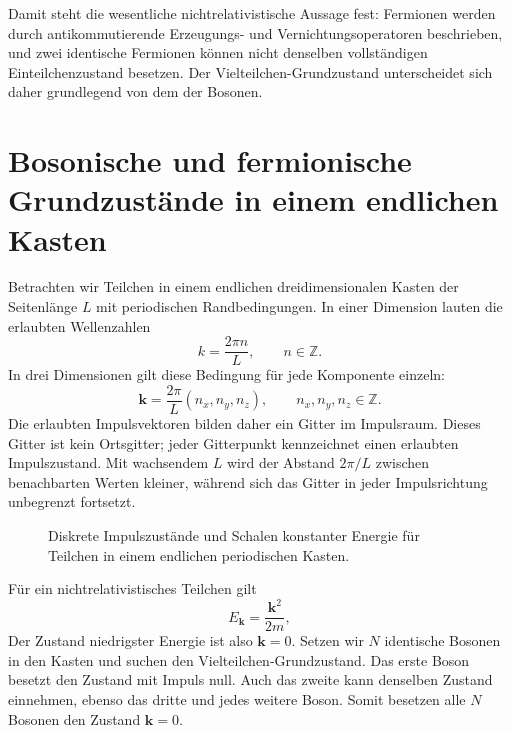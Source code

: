 Damit steht die wesentliche nichtrelativistische Aussage fest: Fermionen werden durch antikommutierende Erzeugungs- und Vernichtungsoperatoren beschrieben, und zwei identische Fermionen können nicht denselben vollständigen Einteilchenzustand besetzen. Der Vielteilchen-Grundzustand unterscheidet sich daher grundlegend von dem der Bosonen.

\section{Bosonische und fermionische Grundzustände in einem endlichen Kasten}

Betrachten wir Teilchen in einem endlichen dreidimensionalen Kasten der Seitenlänge \(L\) mit periodischen Randbedingungen. In einer Dimension lauten die erlaubten Wellenzahlen
\begin{equation}
k=\frac{2\pi n}{L},
\qquad n\in\mathbb{Z}.
\end{equation}
In drei Dimensionen gilt diese Bedingung für jede Komponente einzeln:
\begin{equation}
\mathbf{k}=\frac{2\pi}{L}(n_x,n_y,n_z),
\qquad n_x,n_y,n_z\in\mathbb{Z}.
\end{equation}
Die erlaubten Impulsvektoren bilden daher ein Gitter im Impulsraum. Dieses Gitter ist kein Ortsgitter; jeder Gitterpunkt kennzeichnet einen erlaubten Impulszustand. Mit wachsendem \(L\) wird der Abstand \(2\pi/L\) zwischen benachbarten Werten kleiner, während sich das Gitter in jeder Impulsrichtung unbegrenzt fortsetzt.

\begin{figure}
\centering
{}
\caption{Diskrete Impulszustände und Schalen konstanter Energie für Teilchen in einem endlichen periodischen Kasten.}
\end{figure}

Für ein nichtrelativistisches Teilchen gilt
\begin{equation}
E_{\mathbf{k}}=\frac{\mathbf{k}^2}{2m},
\end{equation}
Der Zustand niedrigster Energie ist also \(\mathbf{k}=0\). Setzen wir \(N\) identische Bosonen in den Kasten und suchen den Vielteilchen-Grundzustand. Das erste Boson besetzt den Zustand mit Impuls null. Auch das zweite kann denselben Zustand einnehmen, ebenso das dritte und jedes weitere Boson. Somit besetzen alle \(N\) Bosonen den Zustand \(\mathbf{k}=0\).

